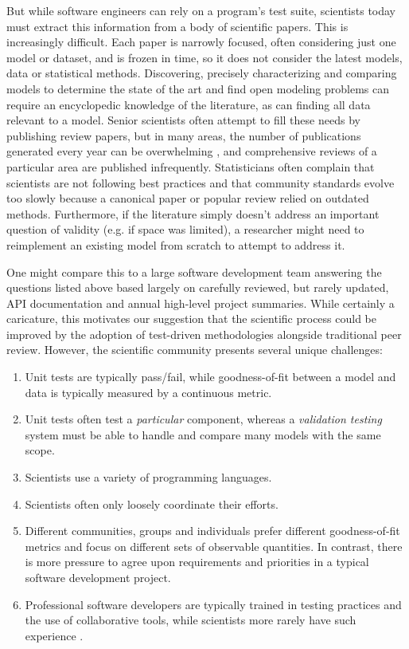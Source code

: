 \documentclass[9pt]{sig-alternate}
\begin{document}
But while software engineers can rely on a program's test suite, scientists today must extract this information from a body of scientific papers. This is increasingly difficult. Each paper is narrowly focused, often considering just one model or dataset, and is frozen in time, so it does not consider the latest models, data or statistical methods. Discovering, precisely characterizing and comparing models to determine the state of the art and find open modeling problems can require an encyclopedic knowledge of the literature, as can finding all data relevant to a model. Senior scientists often attempt to fill these needs by publishing review papers, but in many areas, the number of publications generated every year can be overwhelming \cite{jinha_article_2010}, and comprehensive reviews of a particular area are published infrequently. Statisticians often complain that scientists are not following best practices and that community standards evolve too slowly because a canonical paper or popular review relied on outdated methods. Furthermore, if the literature simply doesn't address an important question of validity (e.g. if space was limited), a researcher might need to reimplement an existing model from scratch to attempt to address it. 

One might compare this to a large software development team answering the questions listed above based largely on carefully reviewed, but rarely updated,  API documentation and annual high-level project summaries.
While certainly a caricature, this motivates our suggestion that the scientific process could be improved by the adoption of test-driven methodologies alongside traditional peer review. However, the scientific community presents several unique challenges:
\begin{enumerate}
\item Unit tests are typically pass/fail, while goodness-of-fit between a model and data is typically measured by a continuous metric. 
\item Unit tests often test a \emph{particular} component, whereas a \emph{validation testing} system must be able to handle and compare many models with the same scope. %
\item Scientists use a variety of programming languages.
\item Scientists often only loosely coordinate their efforts.
\item Different communities, groups and individuals prefer different goodness-of-fit metrics and focus on different sets of observable quantities. In contrast, there is more pressure to agree upon requirements and priorities in a typical software development project.
\item Professional software developers are typically trained in testing practices and the use of collaborative tools, while scientists more rarely have such experience \cite{oai:open.ac.uk.OAI2:17673}. %
\end{enumerate}
\end{document}
